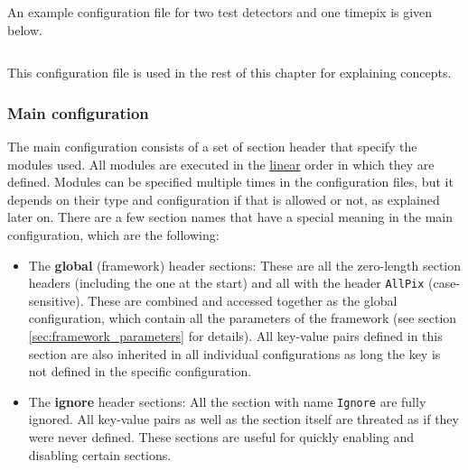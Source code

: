 An example configuration file for two test detectors and one timepix is given below. 
\inputminted[frame=single,framesep=3pt,breaklines=true,tabsize=2,linenos]{ini}{../../etc/manual_detector.conf}

This configuration file is used in the rest of this chapter for explaining concepts. 

\subsubsection{Main configuration}
\label{sec:main_config}
The main configuration consists of a set of section header that specify the modules used. All modules are executed in the \underline{linear} order in which they are defined. Modules can be specified multiple times in the configuration files, but it depends on their type and configuration if that is allowed or not, as explained later on. There are a few section names that have a special meaning in the main configuration, which are the following:
\begin{itemize}
\item The \textbf{global} (framework) header sections: These are all the zero-length section headers (including the one at the start) and all with the header \texttt{AllPix} (case-sensitive). These are combined and accessed together as the global configuration, which contain all the parameters of the framework (see section \ref{sec:framework_parameters} for details). All key-value pairs defined in this section are also inherited in all individual configurations as long the key is not defined in the specific configuration.
\item The \textbf{ignore} header sections: All the section with name \texttt{Ignore} are fully ignored. All key-value pairs as well as the section itself are threated as if they were never defined. These sections are useful for quickly enabling and disabling certain sections.
\end{itemize}

